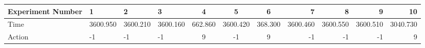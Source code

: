 \documentclass[8pt]{article}
\begin{document}
\begin{landscape}
\begin{tabular}{ | l | l | l | l | c | c | c | r | r | r | r | }
 \hline 
Experiment Number & 1 & 2 & 3 & 4 & 5 & 6 & 7 & 8 & 9 & 10\\ \hline
Time & 3600.950 & 3600.210 & 3600.160 & 662.860 & 3600.420 & 368.300 & 3600.460 & 3600.550 & 3600.510 & 3040.730\\ \hline
Action & -1 & -1 & -1 & 9 & -1 & 9 & -1 & -1 & -1 & 9\\ \hline\end{tabular}
\end{landscape}
\end{document}
